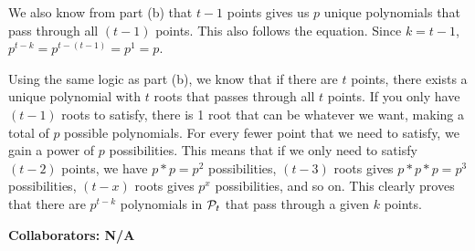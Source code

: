 \documentclass[11pt]{article}
\begin{document}
\begin{enumerate}
\begin{enumerate}
{      We also know from part (b) that $t-1$ points gives us $p$ unique polynomials that pass through all $(t-1)$ points. This also follows the equation. Since $k=t-1$, $p^{t-k}=p^{t-(t-1)}=p^1=p$. \newline

      Using the same logic as part (b), we know that if there are $t$ points, there exists a unique polynomial with $t$ roots that passes through all $t$ points. If you only have $(t-1)$ roots to satisfy, there is 1 root that can be whatever we want, making a total of $p$ possible polynomials. For every fewer point that we need to satisfy, we gain a power of $p$ possibilities. This means that if we only need to satisfy $(t-2)$ points, we have $p*p=p^2$ possibilities, $(t-3)$ roots gives $p*p*p=p^3$ possibilities, $(t-x)$ roots gives $p^x$ possibilities, and so on. This clearly proves that there are $p^{t-k}$ polynomials in ${\mathcal P}_t$ that pass through a given $k$ points.
    }
     \newpage
  \end{enumerate} 

\newpage
     

\end{enumerate}
{\bfseries Collaborators: N/A} \newline 
\end{document}
